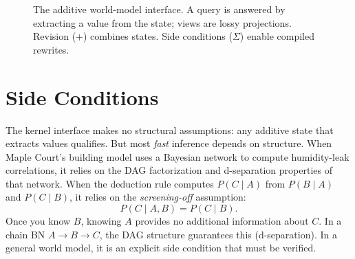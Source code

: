 \documentclass[11pt,openany]{report}
\begin{document}
\begin{figure}[htbp]
\centering
{}
\caption{The additive world-model interface.  A query is answered by
extracting a value from the state; views are lossy projections.
Revision ($+$) combines states.  Side conditions ($\Sigma$) enable
compiled rewrites.}
\label{fig:query-worldmodel-flow}
\end{figure}


\section{Side Conditions}

The kernel interface makes no structural assumptions: any additive
state that extracts values qualifies.  But most \emph{fast} inference
depends on structure.  When Maple Court's building model uses a
Bayesian network to compute humidity-leak correlations, it relies on
the DAG factorization and d-separation properties of that network.
When the deduction rule computes $P(C \mid A)$ from $P(B \mid A)$ and
$P(C \mid B)$, it relies on the \emph{screening-off} assumption:
\[
  P(C \mid A, B) = P(C \mid B).
\]
Once you know $B$, knowing $A$ provides no additional information
about $C$.  In a chain BN $A \to B \to C$, the DAG structure
guarantees this (d-separation).  In a general world model, it is an
explicit side condition that must be verified.
\end{document}
